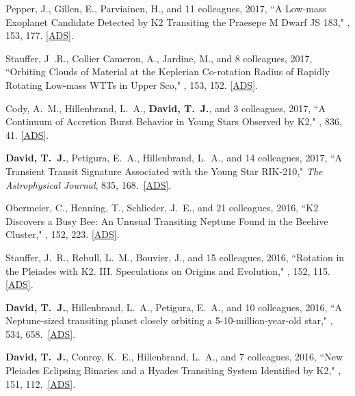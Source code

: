 \item {Pepper}, J., {Gillen}, E., {Parviainen}, H., and 11 colleagues, 2017, ``{A Low-mass Exoplanet Candidate Detected by K2 Transiting the Praesepe M Dwarf JS 183}," \aj, 153, 177. \href{https://ui.adsabs.harvard.edu/#abs/2017AJ....153..177P}{[ADS]}.

\item {Stauffer}, J~.R., {Collier Cameron}, A., {Jardine}, M., and 8 colleagues, 2017, ``{Orbiting Clouds of Material at the Keplerian Co-rotation Radius of Rapidly Rotating Low-mass WTTs in Upper Sco}," \aj, 153, 152. \href{https://ui.adsabs.harvard.edu/#abs/2017AJ....153..152S}{[ADS]}.

\item {Cody}, A.~M., {Hillenbrand}, L.~A., {\bf {David}, T.~J.}, and 3 colleagues, 2017, ``{A Continuum of Accretion Burst Behavior in Young Stars Observed by K2}," \apj, 836, 41. \href{https://ui.adsabs.harvard.edu/#abs/2017ApJ...836...41C}{[ADS]}.

\item {\bf {\bf David, T.}~J.}, {Petigura}, E.~A., {Hillenbrand}, L.~A., and 14 colleagues, 2017, ``{A Transient Transit Signature Associated with the Young Star RIK-210}," \textit{The Astrophysical Journal}, 835, 168.\ \href{https://ui.adsabs.harvard.edu/#abs/2017ApJ...835..168D/}{[ADS]}. 

\item {Obermeier}, C., {Henning}, T., {Schlieder}, J.~E., and 21 colleagues, 2016, ``{K2 Discovers a Busy Bee: An Unusual Transiting Neptune Found in the Beehive Cluster}," \aj, 152, 223. \href{https://ui.adsabs.harvard.edu/#abs/2016AJ....152..223O}{[ADS]}.

\item {Stauffer}, J.~R., {Rebull}, L.~M., {Bouvier}, J., and 15 colleagues, 2016, ``{Rotation in the Pleiades with K2. III. Speculations on Origins and Evolution}," \aj, 152, 115. \href{https://ui.adsabs.harvard.edu/#abs/2016AJ....152..115S}{[ADS]}. 

\item {\bf {\bf David, T.}~J.}, {Hillenbrand}, L.~A., {Petigura}, E.~A., and 10 colleagues, 2016, ``{A Neptune-sized transiting planet closely orbiting a 5-10-million-year-old star}," \nature, 534, 658.\ \href{https://ui.adsabs.harvard.edu/#abs/2016Natur.534..658D/}{[ADS]}. 

\item {\bf {\bf David, T.}~J.}, {Conroy}, K.~E., {Hillenbrand}, L.~A., and 7 colleagues, 2016, ``{New Pleiades Eclipsing Binaries and a Hyades Transiting System Identified by K2}," \aj, 151, 112.\ \href{https://ui.adsabs.harvard.edu/#abs/2016AJ....151..112D/}{[ADS]}.

